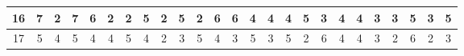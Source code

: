 \begin{sidewaystable}[]
\begin{tabular}{|c|c|c|c|c|c|c|c|c|c|c|c|c|c|c|c|c|c|c|c|c|c|c|c|c|}
    16      & 7                                               & 2                                               & 7                                               & 6                                               & 2                                               & 2                                               & 5                                               & 2                                               & 5                                               & 2                                                & 6                                                & 6                                                 &    4                                               & 4                                               & 4                                               & 5                                               & 3                                               & 4                                               & 4                                               & 3                                               & 3                                               & 5                                                & 3                                                & 5                                                \\ \hline
    17      & 5                                               & 4                                               & 5                                               & 4                                               & 4                                               & 5                                               & 4                                               & 2                                               & 3                                               & 5                                                & 4                                                & 3                                                 &    5                                               & 3                                               & 5                                               & 2                                               & 6                                               & 4                                               & 4                                               & 3                                               & 2                                               & 6                                                & 2                                                & 3                                                \\ \hline

\end{tabular}
\end{sidewaystable}
